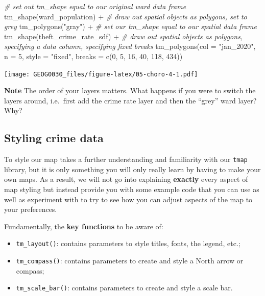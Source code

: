 \documentclass[
]{book}
\newenvironment{Shaded}{\begin{snugshade}}{\end{snugshade}}
\newcommand{\AttributeTok}[1]{\textcolor[rgb]{0.77,0.63,0.00}{#1}}
\newcommand{\CommentTok}[1]{\textcolor[rgb]{0.56,0.35,0.01}{\textit{#1}}}
\newcommand{\DecValTok}[1]{\textcolor[rgb]{0.00,0.00,0.81}{#1}}
\newcommand{\FunctionTok}[1]{\textcolor[rgb]{0.00,0.00,0.00}{#1}}
\newcommand{\NormalTok}[1]{#1}
\newcommand{\SpecialCharTok}[1]{\textcolor[rgb]{0.00,0.00,0.00}{#1}}
\newcommand{\StringTok}[1]{\textcolor[rgb]{0.31,0.60,0.02}{#1}}
\providecommand{\tightlist}{%
  \setlength{\itemsep}{0pt}\setlength{\parskip}{0pt}}
\begin{document}
\begin{Shaded}
\begin{Highlighting}[]
\CommentTok{\# set out tm\_shape equal to our original ward data frame}
\FunctionTok{tm\_shape}\NormalTok{(ward\_population) }\SpecialCharTok{+} 
  \CommentTok{\# draw out spatial objects as polygons, set to grey}
  \FunctionTok{tm\_polygons}\NormalTok{(}\StringTok{"gray"}\NormalTok{) }\SpecialCharTok{+}
\CommentTok{\# set our tm\_shape equal to our spatial data frame}
\FunctionTok{tm\_shape}\NormalTok{(theft\_crime\_rate\_sdf) }\SpecialCharTok{+} 
  \CommentTok{\# draw out spatial objects as polygons, specifying a data column, specifying fixed breaks}
  \FunctionTok{tm\_polygons}\NormalTok{(}\AttributeTok{col =} \StringTok{"jan\_2020"}\NormalTok{, }\AttributeTok{n =} \DecValTok{5}\NormalTok{, }\AttributeTok{style =} \StringTok{"fixed"}\NormalTok{, }\AttributeTok{breaks =} \FunctionTok{c}\NormalTok{(}\DecValTok{0}\NormalTok{, }\DecValTok{5}\NormalTok{, }\DecValTok{16}\NormalTok{, }\DecValTok{40}\NormalTok{, }\DecValTok{118}\NormalTok{, }\DecValTok{434}\NormalTok{)) }
\end{Highlighting}
\end{Shaded}

\texttt{[image: GEOG0030\_files/figure-latex/05-choro-4-1.pdf]}

\textbf{Note}
The order of your layers matters. What happens if you were to switch the layers around, i.e.~first add the crime rate layer and then the ``grey'' ward layer? Why?

\hypertarget{styling-crime-data}{%
\subsection{Styling crime data}\label{styling-crime-data}}

To style our map takes a further understanding and familiarity with our \texttt{tmap} library, but it is only something you will only really learn by having to make your own maps. As a result, we will not go into explaining \textbf{exactly} every aspect of map styling but instead provide you with some example code that you can use as well as experiment with to try to see how you can adjust aspects of the map to your preferences.

Fundamentally, the \textbf{key functions} to be aware of:

\begin{itemize}
\tightlist
\item
  \texttt{tm\_layout()}: contains parameters to style titles, fonts, the legend, etc.;
\item
  \texttt{tm\_compass()}: contains parameters to create and style a North arrow or compass;
\item
  \texttt{tm\_scale\_bar()}: contains parameters to create and style a scale bar.
\end{itemize}
\end{document}
